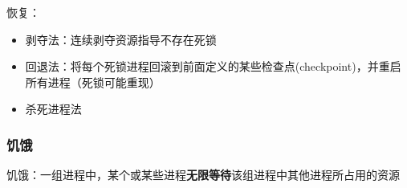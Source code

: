 恢复：
\begin{itemize}
    \item 剥夺法：连续剥夺资源指导不存在死锁
    \item 回退法：将每个死锁进程回滚到前面定义的某些检查点(checkpoint)，并重启所有进程（死锁可能重现）
    \item 杀死进程法
\end{itemize}

\subsubsection{饥饿}
饥饿：一组进程中，某个或某些进程\textbf{无限等待}该组进程中其他进程所占用的资源